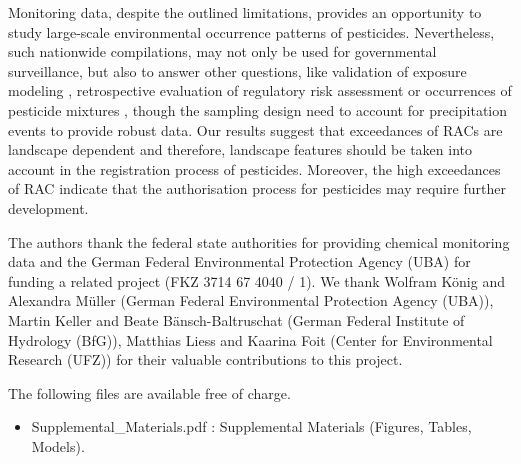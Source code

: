 \documentclass[journal=esthag,manuscript=article]{achemso}
\begin{document}
Monitoring data, despite the outlined limitations, provides an opportunity to study large-scale environmental occurrence patterns of pesticides.
Nevertheless, such nationwide compilations, may not only be used for governmental surveillance, but also to answer other questions, like validation of exposure modeling \cite{knabel_fungicide_2014}, retrospective evaluation of regulatory risk assessment \citep{knauer_pesticides_2016,stehle_pesticide_2015}or occurrences of pesticide mixtures \cite{schreiner_pesticide_2016}, though the sampling design need to account for precipitation events to provide robust data. 
Our results suggest that exceedances of RACs are landscape dependent %
and therefore, landscape features should be taken into account in the registration process of pesticides.
Moreover, the high exceedances of RAC indicate that the authorisation process for pesticides may require further development. 





\begin{acknowledgement}
The authors thank the federal state authorities for providing chemical monitoring data and the German Federal Environmental Protection Agency (UBA) for funding a related project (FKZ 3714 67 4040 / 1). 
We thank Wolfram König and Alexandra Müller (German Federal Environmental Protection Agency (UBA)), Martin Keller and Beate Bänsch-Baltruschat (German Federal Institute of Hydrology (BfG)), Matthias Liess and Kaarina Foit (Center for Environmental Research (UFZ)) for their valuable contributions to this project. 
\end{acknowledgement}



\begin{suppinfo}
The following files are available free of charge.
\begin{itemize}
  \item Supplemental\_Materials.pdf : Supplemental Materials (Figures, Tables, Models).
\end{itemize}
\end{suppinfo}



\end{document}
